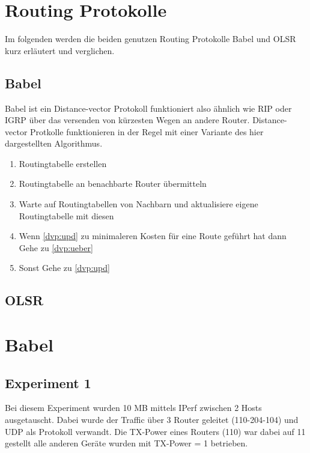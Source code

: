 \documentclass[10pt]{scrartcl}
\begin{document}
	
		
		
	
	
\section{Routing Protokolle}
	Im folgenden werden die beiden genutzen Routing Protokolle Babel und OLSR kurz erläutert und verglichen.
	
	\subsection{Babel}
	Babel ist ein Distance-vector Protokoll funktioniert also ähnlich wie RIP oder IGRP über das versenden von kürzesten Wegen an andere Router. Distance-vector Protkolle funktionieren in der Regel mit einer Variante des hier dargestellten Algorithmus.
	
	\begin{enumerate}
		\item Routingtabelle erstellen
		\item \label{dvp:ueber} Routingtabelle an benachbarte Router übermitteln
		\item \label{dvp:upd} Warte auf Routingtabellen von Nachbarn und aktualisiere eigene Routingtabelle mit diesen
		\item Wenn \ref{dvp:upd} zu minimaleren Kosten für eine Route geführt hat dann
			\subitem Gehe zu \ref{dvp:ueber}
		\item Sonst
			\subitem Gehe zu \ref{dvp:upd}
	\end{enumerate}
	
	
	
	\subsection{OLSR}

\section{Babel}
	\subsection{Experiment 1}
	Bei diesem Experiment wurden 10 MB mittels IPerf zwischen 2 Hosts ausgetauscht. Dabei wurde der Traffic über 3 Router geleitet (110-204-104) und UDP als Protokoll verwandt. Die TX-Power eines Routers (110) war dabei auf 11 gestellt alle anderen Geräte wurden mit TX-Power = 1 betrieben.
	
\end{document}
